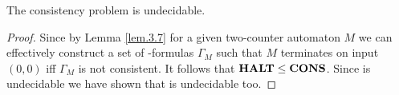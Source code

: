 \begin{theorem}\label{the.3.8}
	The consistency problem is undecidable.
\end{theorem}
\begin{proof}
	Since by Lemma \ref{lem.3.7} for a given two-counter automaton $M$ we can effectively construct a set of \SysP-formulas $\Gamma_M$ such that $M$ terminates on input $(0,0)$ iff $\Gamma_M$ is not consistent. It follows that $\textbf{HALT}\leq\textbf{CONS}$. Since \autHalt{} is undecidable we have shown that \PCons{} is undecidable too.
\end{proof}
